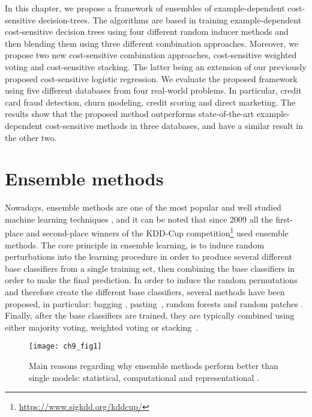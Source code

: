 In this chapter, we propose a framework of ensembles of example-dependent cost-sensitive 
decision-trees. The algorithms are based in training example-dependent cost-sensitive decision 
trees using four different random inducer methods and then blending them using three different 
combination approaches. Moreover, we propose two new cost-sensitive combination approaches, 
cost-sensitive weighted voting and cost-sensitive stacking. The latter being an extension of our 
previously proposed cost-sensitive logistic regression. We evaluate the proposed framework using 
five different databases from four real-world problems. In particular, credit card fraud detection, 
churn modeling, credit scoring and direct marketing. The results show that the proposed method 
outperforms state-of-the-art example-dependent cost-sensitive methods in three databases, and have 
a similar result in the other two.

\section{Ensemble methods}
\label{sec:9:ensemble}

Nowadays,   ensemble methods are  one 
of the most popular and well studied machine learning techniques   \citep{Zhou2012}, and it can be 
noted that since 2009 all the first-place and   second-place winners of the KDD-Cup 
competition\footnote{\url{https://www.sigkdd.org/kddcup/}}   used  ensemble methods. The core 
principle in ensemble learning, is to induce random perturbations into  the learning procedure in 
order to produce several different base classifiers from a single  training set, then combining the 
base classifiers in order to make the final prediction.  In order to induce the random permutations 
and therefore create the different base classifiers,   several methods have been proposed, in 
particular: bagging \citep{Breiman1996},   pasting~\citep{Breiman1999}, random forests 
\citep{Breiman2001} and random patches   \citep{Louppe2012}. Finally, after  the base   classifiers 
are trained, they are typically   combined using either   majority voting,  weighted  voting    or  
stacking~\citep{Zhou2012}.

\begin{figure}[t!]
\centering
\texttt{[image: ch9\_fig1]}
\caption{Main reasons regarding why ensemble methods perform better than 
  single models: statistical, computational and representational \citep{Dietterich2000a}.}
\label{fig:9:1}
\end{figure} 

